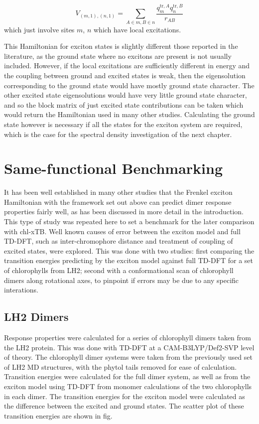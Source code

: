 \begin{equation}
    V_{\left(m, 1\right), \left(n,1\right)} = \sum_{A \in m, B \in n} \frac{q^{\text{tr},A}_m q^{\text{tr},B}_n}{r_{AB}}
    \label{eq:exciton_coupling}
\end{equation}
%
which just involve sites $m$, $n$ which have local excitations.

This Hamiltonian for exciton states is slightly different those reported in the 
literature, as the ground state where no excitons are present is not usually included.
However, if the local excitations are sufficiently different in energy and the coupling
between ground and excited states is weak, then the eigensolution corresponding 
to the ground state would have mostly ground state character. The other excited
state eigensolutions would have very little ground state character, and so the block
matrix of just excited state contributions can be taken which would return the Hamiltonian
used in many other studies. Calculating the ground state however is necessary if
all the states for the exciton system are required, which is the case for the
spectral density investigation of the next chapter.

\section{Same-functional Benchmarking}
\label{sec:exction_v_full_dimer}

It has been well established in many other studies that the Frenkel exciton Hamiltonian
with the framework set out above can predict dimer response properties fairly well,
as has been discussed in more detail in the introduction. This type of study was
repeated here to set a benchmark for the later comparison with chl-xTB. Well known
causes of error between the exciton model and full TD-DFT, such as inter-chromophore 
distance and treatment of coupling of excited states, were explored. This was done
with two studies: first comparing the transition energies predicting by the exciton 
model against full TD-DFT for a set of chlorophylls from LH2; second with a conformational
scan of chlorophyll dimers along rotational axes, to pinpoint if errors may be due
to any specific interations.

\subsection{LH2 Dimers}
\label{subsec:LH2_exciton_camb3lyp}

Response properties were calculated for a series of chlorophyll dimers taken from
the LH2 protein. This was done with TD-DFT at a CAM-B3LYP/Def2-SVP level of theory.
The chlorophyll dimer systems were taken from the previously used set of LH2 MD 
structures, with the phytol tails removed for ease of calculation. Transition energies
were calculated for the full dimer system, as well as from the exciton model using 
TD-DFT from monomer calculations of the two chlorophylls in each dimer. The transition
energies for the exciton model were calculated as the difference between the excited 
and ground states. The scatter plot of these transition energies are shown in fig. 

